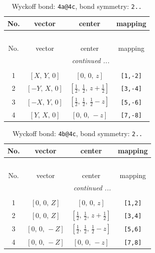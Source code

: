 \documentclass[fleqn,8pt]{jsarticle}
\begin{document}
\begin{longtable}{cccc}
\caption{Wyckoff bond: {\tt 4a@4c}, bond symmetry: {\tt 2..}}
 \\
 \hline \hline
No. & vector & center & mapping \\ \hline \endfirsthead

\multicolumn{3}{l}{\tablename\ \thetable{}} \\
 \hline \hline
No. & vector & center & mapping \\ \hline \endhead

 \hline \hline
\multicolumn{3}{r}{\footnotesize\it continued ...} \\ \endfoot

 \hline \hline
\multicolumn{3}{r}{} \\ \endlastfoot

1 & $\left[ X,\, Y,\, 0 \right]$ & $\left[ 0,\, 0,\, z \right]$ & {\tt [1,-2]} \\ \hline
2 & $\left[ - Y,\, X,\, 0 \right]$ & $\left[ \frac{1}{2},\, \frac{1}{2},\, z + \frac{1}{2} \right]$ & {\tt [3,-4]} \\ \hline
3 & $\left[ - X,\, Y,\, 0 \right]$ & $\left[ \frac{1}{2},\, \frac{1}{2},\, \frac{1}{2} - z \right]$ & {\tt [5,-6]} \\ \hline
4 & $\left[ Y,\, X,\, 0 \right]$ & $\left[ 0,\, 0,\, - z \right]$ & {\tt [7,-8]} \\
\end{longtable}
\renewcommand{\arraystretch}{1.2}
\begin{longtable}{cccc}
\caption{Wyckoff bond: {\tt 4b@4c}, bond symmetry: {\tt 2..}}
 \\
 \hline \hline
No. & vector & center & mapping \\ \hline \endfirsthead

\multicolumn{3}{l}{\tablename\ \thetable{}} \\
 \hline \hline
No. & vector & center & mapping \\ \hline \endhead

 \hline \hline
\multicolumn{3}{r}{\footnotesize\it continued ...} \\ \endfoot

 \hline \hline
\multicolumn{3}{r}{} \\ \endlastfoot

1 & $\left[ 0,\, 0,\, Z \right]$ & $\left[ 0,\, 0,\, z \right]$ & {\tt [1,2]} \\ \hline
2 & $\left[ 0,\, 0,\, Z \right]$ & $\left[ \frac{1}{2},\, \frac{1}{2},\, z + \frac{1}{2} \right]$ & {\tt [3,4]} \\ \hline
3 & $\left[ 0,\, 0,\, - Z \right]$ & $\left[ \frac{1}{2},\, \frac{1}{2},\, \frac{1}{2} - z \right]$ & {\tt [5,6]} \\ \hline
4 & $\left[ 0,\, 0,\, - Z \right]$ & $\left[ 0,\, 0,\, - z \right]$ & {\tt [7,8]} \\
\end{longtable}
\end{document}
